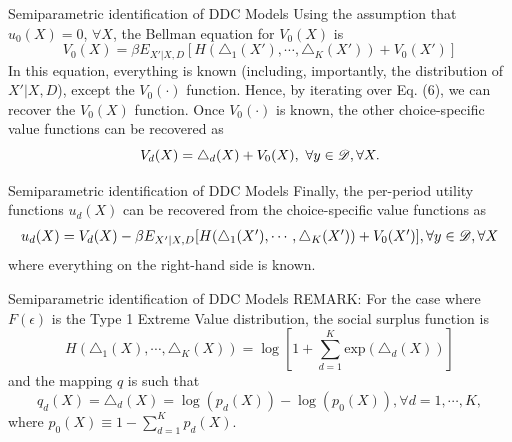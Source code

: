 \documentclass[aspectratio=169,11pt]{beamer}
\begin{document}
\begin{frame}{Semiparametric identification of DDC Models}
Using the assumption that $u_0(X) = 0$, $\forall X$, the Bellman equation for $V_0(X)$ is 
\begin{equation}
V_0(X) = \beta E_{X'|X,D} [ H (\triangle_1(X'), \cdots , \triangle_K(X')) + V_0(X')]
\end{equation}
In this equation, everything is known (including, importantly, the distribution of $X'|X, D$), except the $V_0(\cdot)$ function. Hence, by iterating over Eq. (6), we can recover the $V_0(X)$ function. Once $V_0(\cdot)$ is known, the other choice-specific value functions can be recovered as 
\begin{equation*}
V_d(X) = \triangle_d(X) + V_0(X), ~ \forall y \in \mathscr{D}, \forall X.
\end{equation*}
\end{frame}

\begin{frame}{Semiparametric identification of DDC Models}
Finally, the per-period utility functions $u_d(X)$ can be recovered from the choice-specific value functions as 
\begin{equation*}
\resizebox{.99 \hsize}{!}{$ u_d(X) = V_d(X) - \beta E_{X'|X,D} [ H (\triangle_1 (X'), \cdots , \triangle_K(X')) + V_0(X') ], \forall y \in \calD, \forall X $}
\end{equation*}
where everything on the right-hand side is known. 
\end{frame}


\begin{frame}{Semiparametric identification of DDC Models}
REMARK: For the case where $F (\epsilon)$ is the Type 1 Extreme Value distribution, the social surplus function is 
\begin{equation*}
H(\triangle_1(X), \cdots , \triangle_K (X)) = \log \left [ 1 + \sum^K_{d=1} \text{exp} (\triangle_d(X)) \right ]
\end{equation*}
and the mapping $q$ is such that
\begin{equation*}
q_d(X) = \triangle_d(X) = \log (p_d(X)) - \log(p_0(X)), \forall d = 1, \cdots , K ,
\end{equation*}
where $p_0(X) \equiv 1 - \sum^K_{d=1} p_d(X).$
\end{frame}
\end{document}
